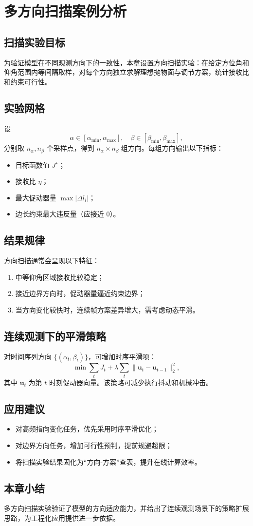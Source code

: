 \chapter{多方向扫描案例分析}

\section{扫描实验目标}
为验证模型在不同观测方向下的一致性，本章设置方向扫描实验：在给定方位角和仰角范围内等间隔取样，对每个方向独立求解理想抛物面与调节方案，统计接收比和约束可行性。

\section{实验网格}
设
\[
\alpha\in[\alpha_{\min},\alpha_{\max}],\quad
\beta\in[\beta_{\min},\beta_{\max}],
\]
分别取 $n_\alpha,n_\beta$ 个采样点，得到 $n_\alpha\times n_\beta$ 组方向。每组方向输出以下指标：
\begin{itemize}
  \item 目标函数值 $J^\star$；
  \item 接收比 $\eta$；
  \item 最大促动器量 $\max|\Delta l_i|$；
  \item 边长约束最大违反量（应接近 0）。
\end{itemize}

\section{结果规律}
方向扫描通常会呈现以下特征：
\begin{enumerate}
  \item 中等仰角区域接收比较稳定；
  \item 接近边界方向时，促动器量逼近约束边界；
  \item 当方向变化较快时，连续帧方案差异增大，需考虑动态平滑。
\end{enumerate}

\section{连续观测下的平滑策略}
对时间序列方向 $\{(\alpha_t,\beta_t)\}$，可增加时序平滑项：
\[
\min \sum_t J_t + \lambda\sum_t\|\mathbf u_t-\mathbf u_{t-1}\|_2^2,
\]
其中 $\mathbf u_t$ 为第 $t$ 时刻促动器向量。该策略可减少执行抖动和机械冲击。

\section{应用建议}
\begin{itemize}
  \item 对高频指向变化任务，优先采用时序平滑优化；
  \item 对边界方向任务，增加可行性预判，提前规避超限；
  \item 将扫描实验结果固化为“方向-方案”查表，提升在线计算效率。
\end{itemize}

\section{本章小结}
多方向扫描实验验证了模型的方向适应能力，并给出了连续观测场景下的策略扩展思路，为工程化应用提供进一步依据。
